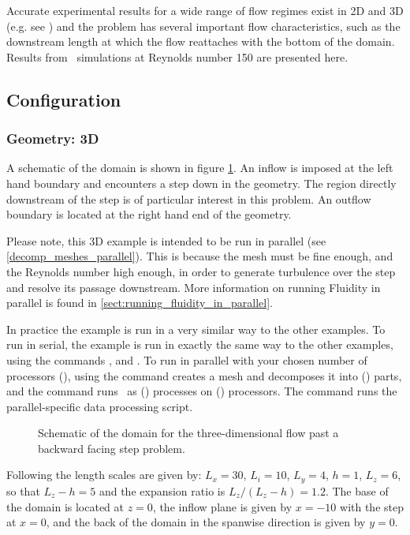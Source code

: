 Accurate experimental results for a wide range of flow regimes exist
in 2D and 3D
(e.g. see \cite{armaly1983}) and the problem has several important flow
characteristics, such as the downstream length at which the flow reattaches
with the bottom of the domain. Results from \fluidity\ simulations at Reynolds number 150
are presented here.


\subsection{Configuration}
\subsubsection{Geometry: 3D}
A schematic of the domain is shown in figure \ref{Fig:Schematic3d}.
An inflow is imposed at the left hand boundary and encounters a step
down in the geometry. The region directly downstream of the step is
of particular interest in this problem. An outflow boundary is located at the
right hand end of the geometry.

Please note, this 3D example is intended to be run in parallel (see \ref{decomp_meshes_parallel}).
This is because the mesh must be fine enough, and the Reynolds number high enough, in order to
generate turbulence over the step and resolve its passage downstream. More information on running
Fluidity in parallel is found in \ref{sect:running_fluidity_in_parallel}.

In practice the example is run in a very similar way to the other examples.
To run in serial, the example is run in exactly the same way to the other examples, using
the commands ,  and .
To run in parallel with your chosen number of processors (), using the command
 creates a mesh and decomposes it into () parts, and
the command  runs \fluidity\ as () processes on () processors.
The command  runs the parallel-specific data processing script.

\begin{figure}
\centering
{}
\caption{Schematic of the domain for the three-dimensional flow past a backward facing step
problem.}
\label{Fig:Schematic3d}
\end{figure}

Following \cite{le1997} the length scales are given by: $L_x=30$, $L_i=10$, $L_y=4$, $h=1$, $L_z=6$,
so that $L_z-h=5$ and the expansion ratio is $L_z/(L_z-h)=1.2$.
The base of the domain is located at $z=0$, the inflow plane is given by $x=-10$ with the step
at $x=0$, and the back of the domain in the spanwise direction is given by $y=0$.

